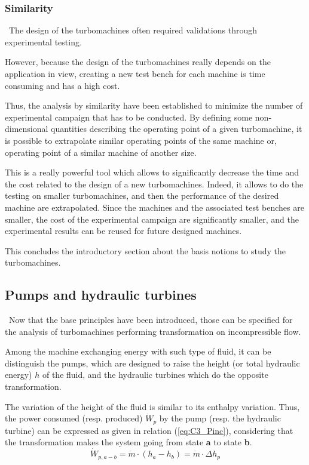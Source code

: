 \subsubsection{Similarity}
\quad\ The design of the turbomachines often required validations through experimental testing.  

However, because the design of the turbomachines really depends on the application in view, creating a new test bench for each machine is time consuming and has a high cost. 

Thus, the analysis by similarity have been established to 
minimize the number of experimental campaign that has to be conducted. By defining some non-dimensional quantities describing the operating point of a given turbomachine, it is possible to extrapolate similar operating points of the same machine or, operating point of a similar machine of another size. 

This is a really powerful tool which allows to significantly decrease the time and the cost related to the design of a new turbomachines. Indeed, it allows to do the testing on smaller turbomachines, and then the performance of the desired machine are extrapolated. Since the machines and the associated test benches are smaller, the cost of the experimental campaign are significantly smaller, and the experimental results can be reused for future designed machines.

This concludes the introductory section about the basis notions to study the turbomachines. 
\newpage
\subsection{Pumps and hydraulic turbines}
\quad\, Now that the base principles have been introduced, those can be specified for the analysis of turbomachines performing transformation on incompressible flow. 

Among the machine exchanging energy with such type of fluid, it can be distinguish the pumps, which are designed to raise the height (or total hydraulic energy) \(h\) of the fluid, and the hydraulic turbines which do the opposite transformation. 

The variation of the height of the fluid is similar to its enthalpy variation. Thus, the power consumed (resp. produced) \(\dot{W}_p\) by the pump (resp. the hydraulic turbine) can be expressed as given in relation (\ref{eq:C3_Pinc}), considering that the transformation makes the system going from state \textbf{a} to state \textbf{b}.
\begin{equation}
    \dot{W}_{p,a-b} = \dot{m}\cdot (h_a - h_b)=\dot{m}\cdot\Delta h_p \label{eq:C3_Pinc}
\end{equation}


